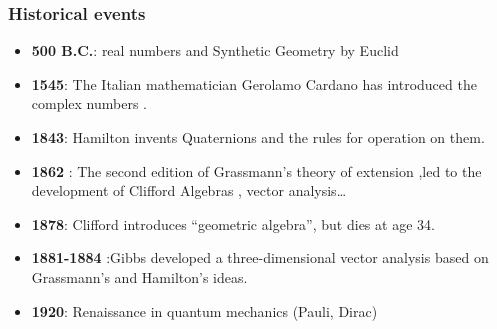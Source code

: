 \label{blocks}
\begin{frame}\frametitle{Historical events}
 \begin{itemize} 
\item
\textbf{500 B.C.}: real numbers and Synthetic Geometry by Euclid
\pause  \item
\textbf{1545}:  The Italian mathematician Gerolamo Cardano has introduced the complex numbers .
\pause 
\item
\textbf{1843}: Hamilton invents Quaternions and the rules for operation on them.
\pause 
\item
\textbf{1862} :  The second edition of Grassmann's theory of extension ,led to the development of Clifford Algebras , vector analysis…
\pause 
\item
\textbf{1878}: Clifford introduces “geometric algebra”, but dies at age 34. 
\pause 
\item
\textbf{1881-1884} :Gibbs developed a three-dimensional vector analysis based on Grassmann's and Hamilton's ideas.
\pause 
\item
\textbf{1920}: Renaissance in quantum mechanics (Pauli, Dirac)
\end{itemize}

\end{frame}
